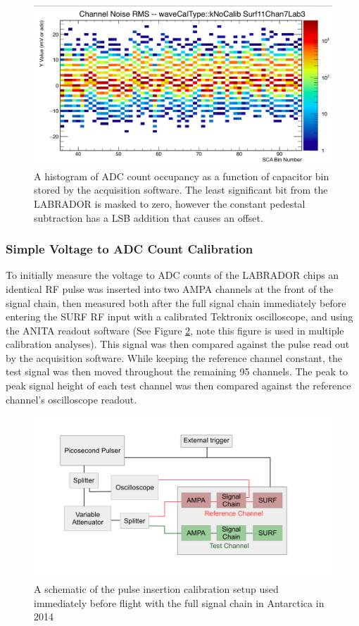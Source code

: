 		
	\begin{figure}
		\includegraphics[width=\textwidth]{figures/pedsEvenOdd}
		\caption{A histogram of ADC count occupancy as a function of capacitor bin stored by the acquisition software.  The least significant bit from the LABRADOR is masked to zero, however the constant pedestal subtraction has a LSB addition that causes an offset.}
		\label{fig:evenOddPeds}
	\end{figure}
		
	
	
	\subsubsection{Simple Voltage to ADC Count Calibration}
	To initially measure the voltage to ADC counts of the LABRADOR chips an identical RF pulse was inserted into two AMPA channels at the front of the signal chain, then measured both after the full signal chain immediately before entering the SURF RF input with a calibrated Tektronix oscilloscope, and using the ANITA readout software (See Figure \ref{fig:calSetup}, note this figure is used in multiple calibration analyses). This signal was then compared against the pulse read out by the acquisition software.  While keeping the reference channel constant, the test signal was then moved throughout the remaining 95 channels.  The peak to peak signal height of each test channel was then compared against the reference channel's oscilloscope readout.
		
			
	\begin{figure}
		\includegraphics[width=\textwidth]{figures/antarctica14_calSetup}
		\caption{A schematic of the pulse insertion calibration setup used immediately before flight with the full signal chain in Antarctica in 2014}
		\label{fig:calSetup}
	\end{figure}
		
